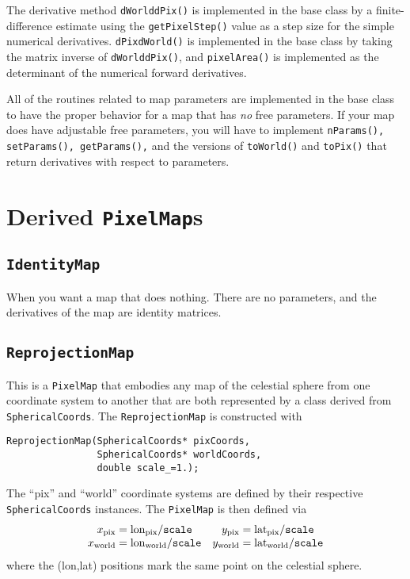 \documentclass[11pt,preprint,flushrt]{aastex}
\begin{document}
The derivative method {\tt dWorlddPix()} is implemented in the base class by a finite-difference estimate using the {\tt getPixelStep()} value as a step size for the simple numerical derivatives.  {\tt dPixdWorld()} is implemented in the base class by taking the matrix inverse of {\tt dWorlddPix()},  and {\tt pixelArea()} is implemented as the determinant of the numerical forward derivatives.

All of the routines related to map parameters are implemented in the base class to have the proper behavior for a map that has {\em no} free parameters.  If your map does have adjustable free parameters, you will have to implement {\tt nParams(), setParams(), getParams(),} and the versions of {\tt toWorld()} and {\tt toPix()} that return derivatives with respect to parameters.

\section{Derived {\tt PixelMap}s}
\subsection{{\tt IdentityMap}}
When you want a map that does nothing.  There are no parameters, and the derivatives of the map are identity matrices.

\subsection{{\tt ReprojectionMap}}
This is a {\tt PixelMap} that embodies any map of the celestial sphere from one coordinate system to another that are both represented by a class derived from {\tt SphericalCoords}.  The {\tt ReprojectionMap} is constructed with
\begin{verbatim}
ReprojectionMap(SphericalCoords* pixCoords,
                SphericalCoords* worldCoords,
                double scale_=1.);
\end{verbatim}
The ``pix'' and ``world'' coordinate systems are defined by their respective {\tt SphericalCoords} instances.  The {\tt PixelMap} is then defined via
\begin{equation}
\begin{array}{cc}
x_{\rm pix} = {\rm lon}_{\rm pix}/{\tt scale} & y_{\rm pix} = {\rm lat}_{\rm pix}/{\tt scale}  \\
x_{\rm world} = {\rm lon}_{\rm world}/{\tt scale} & y_{\rm world} = {\rm lat}_{\rm world}/{\tt scale} 
\end{array}
\end{equation}
where the (lon,lat) positions mark the same point on the celestial sphere.  
\end{document}
